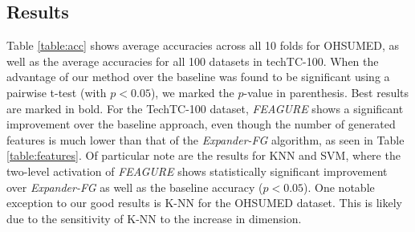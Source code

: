 \documentclass[twoside,11pt]{article}
\theoremstyle{definition}
\begin{document}
\subsection{Results}

Table \ref{table:acc} shows average accuracies across all 10 folds for OHSUMED, as well as the average accuracies for all 100 datasets in techTC-100. When the advantage of our method over the baseline was found to be significant using a pairwise t-test (with $p<0.05$), we marked the $p$-value in parenthesis. Best results are marked in bold.
For the TechTC-100 dataset, \emph{FEAGURE} shows a significant improvement over the baseline approach, even though the number of generated features is much lower than that of the \emph{Expander-FG} algorithm, as seen in Table \ref{table:features}.
Of particular note are the results for KNN and SVM, where the two-level activation of \emph{FEAGURE} shows statistically significant improvement over \emph{Expander-FG} as well as the baseline accuracy ($p < 0.05$). 
One notable exception to our good results is K-NN for the OHSUMED dataset. This is likely due to the sensitivity of K-NN to the increase in dimension. 

\end{document}
